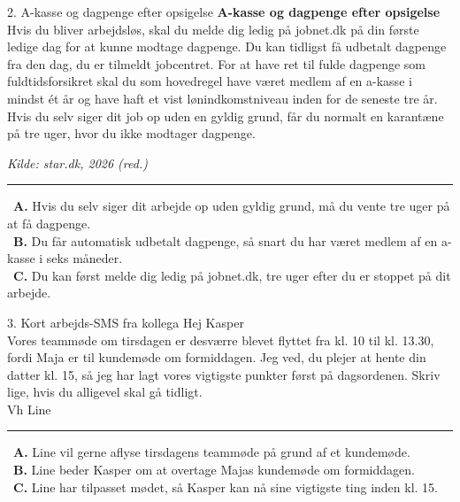 \begin{emailbox}{2. A-kasse og dagpenge efter opsigelse}
\textbf{A-kasse og dagpenge efter opsigelse}\\
Hvis du bliver arbejdsløs, skal du melde dig ledig på jobnet.dk på din første ledige dag for at kunne modtage dagpenge. Du kan tidligst få udbetalt dagpenge fra den dag, du er tilmeldt jobcentret. For at have ret til fulde dagpenge som fuldtidsforsikret skal du som hovedregel have været medlem af en a-kasse i mindst ét år og have haft et vist lønindkomstniveau inden for de seneste tre år. Hvis du selv siger dit job op uden en gyldig grund, får du normalt en karantæne på tre uger, hvor du ikke modtager dagpenge.
\par\noindent\hfill {\small\textit{Kilde: star.dk, 2026 (red.)}}

\vspace{0.3em}
\hrule
\vspace{0.3em}
\small
\fbox{\phantom{X}}\ \textbf{A.} Hvis du selv siger dit arbejde op uden gyldig grund, må du vente tre uger på at få dagpenge.\\[0.25em]
\fbox{\phantom{X}}\ \textbf{B.} Du får automatisk udbetalt dagpenge, så snart du har været medlem af en a-kasse i seks måneder.\\[0.25em]
\fbox{\phantom{X}}\ \textbf{C.} Du kan først melde dig ledig på jobnet.dk, tre uger efter du er stoppet på dit arbejde.
\end{emailbox}

\begin{emailbox}{3. Kort arbejds-SMS fra kollega}
Hej Kasper\\
Vores teammøde om tirsdagen er desværre blevet flyttet fra kl. 10 til kl. 13.30, fordi Maja er til kundemøde om formiddagen. Jeg ved, du plejer at hente din datter kl. 15, så jeg har lagt vores vigtigste punkter først på dagsordenen. Skriv lige, hvis du alligevel skal gå tidligt.\\
Vh Line

\vspace{0.3em}
\hrule
\vspace{0.3em}
\small
\fbox{\phantom{X}}\ \textbf{A.} Line vil gerne aflyse tirsdagens teammøde på grund af et kundemøde.\\[0.25em]
\fbox{\phantom{X}}\ \textbf{B.} Line beder Kasper om at overtage Majas kundemøde om formiddagen.\\[0.25em]
\fbox{\phantom{X}}\ \textbf{C.} Line har tilpasset mødet, så Kasper kan nå sine vigtigste ting inden kl. 15.
\end{emailbox}


